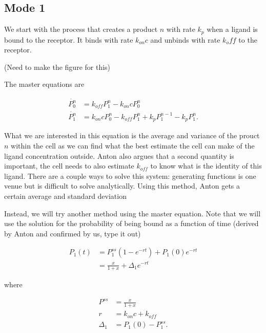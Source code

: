 \subsection{\label{sec:mode1}Mode 1}

We start with the process that creates a product $n$ with rate $k_p$ when a ligand is bound to the receptor. It binds with rate $k_{on}c$ and unbinds with rate $k_off$ to the receptor.

(Need to make the figure for this)

The master equations are

\begin{equation}
\begin{aligned}
 \dot{P_0^n} &= k_{off}P_1^n -k_{on}cP_0^n \\
 \dot{P_1^n} &= k_{on}cP_0^n -k_{off}P_1^n + k_pP_1^{n-1} - k_pP_1^{n}.
\end{aligned}
\end{equation}

What we are interested in this equation is the average and variance of the prouct $n$ within the cell as we can find what the best estimate the cell can make of the ligand concentration outside. Anton also argues that a second quantity is important, the cell needs to also estimate $k_{off}$ to know what is the identity of this ligand. There are a couple ways to solve this system: generating functions is one venue but is difficult to solve analytically. Using this method, Anton gets a certain average and standard deviation

Instead, we will try another method using the master equation. Note that we will use the solution for the probability of being bound as a function of time (derived by Anton and confirmed by us, type it out)

\begin{equation}
\begin{aligned}
P_1(t) & =  P_1^{ss}(1-e^{-rt}) + P_1(0)e^{-rt}\\
	   & = \frac{x}{1+x} + \Delta_1 e^{-rt}
\end{aligned}
\end{equation}

where

\begin{equation*}
\begin{aligned}
P^{ss} & = \frac{x}{1+x}\\
r & = k_{on}c + k_{off}\\
\Delta_1 & = P_1(0) - P_1^{ss}.
\end{aligned}
\end{equation*}

